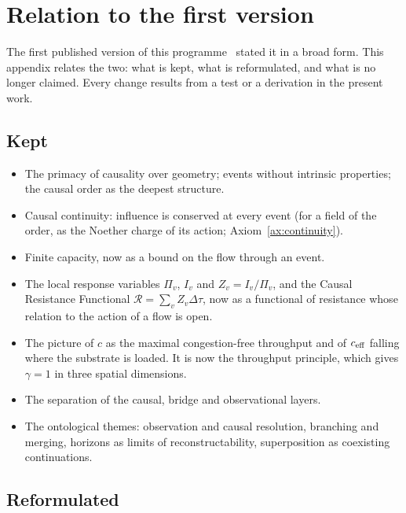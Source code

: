 \section{Relation to the first version}\label{app:changes}

The first published version of this programme~\cite{Sikula2026v1} stated it in a broad form. This
appendix relates the two: what is kept, what is reformulated, and what is no longer claimed. Every change
results from a test or a derivation in the present work.

\subsection{Kept}

\begin{itemize}
\item The primacy of causality over geometry; events without intrinsic properties; the causal order as
  the deepest structure.
\item Causal continuity: influence is conserved at every event (for a field of the order, as the Noether charge of its action; Axiom~\ref{ax:continuity}).
\item Finite capacity, now as a bound on the flow through an event.
\item The local response variables $\Pi_v$, $I_v$ and $Z_v=I_v/\Pi_v$, and the Causal Resistance
  Functional $\mathcal R=\sum_vZ_v\Delta\tau$, now as a functional of resistance whose relation to the action of
  a flow is open.
\item The picture of $c$ as the maximal congestion-free throughput and of $c_{\rm eff}$ falling where the
  substrate is loaded. It is now the throughput principle, which gives $\gamma=1$ in three spatial
  dimensions.
\item The separation of the causal, bridge and observational layers.
\item The ontological themes: observation and causal resolution, branching and merging, horizons as
  limits of reconstructability, superposition as coexisting continuations.
\end{itemize}

\subsection{Reformulated}


